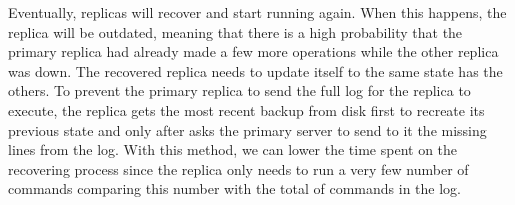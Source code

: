 \medskip

Eventually, replicas will recover and start running again. When this happens, the replica
will be outdated, meaning that there is a high probability that the primary replica had
already made a few more operations while the other replica was down. The recovered
replica needs to update itself to the same state has the others. To prevent the primary
replica to send the full log for the replica to execute, the replica gets the most recent
backup from disk first to recreate its previous state and only after asks the primary
server to send to it the missing lines from the log. With this method, we can lower the
time spent on the recovering process since the replica only needs to run a very few
number of commands comparing this number with the total of commands in the log.